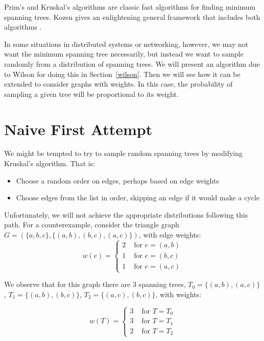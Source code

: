 \documentclass[11pt]{article}
\begin{document}
Prim's and Kruskal's algorithms are classic fast algorithms for finding minimum
spanning trees. Kozen gives an enlightening general framework that includes both
algorithms \cite{kozen}.

In some situations in distributed systems or networking, however, we may not
want the minimum spanning tree necessarily, but instead we want to sample
randomly from a distribution of spanning trees. We will present an algorithm due
to Wilson \cite{wilson} for doing this in Section~\ref{wilson}. Then we will see
how it can be extended to consider graphs with weights. In this case, the
probability of sampling a given tree will be proportional to its weight.



\section{Naive First Attempt}

We might be tempted to try to sample random spanning trees by modifying
Kruskal's algorithm. That is:
\begin{itemize}
\item Choose a random order on edges, perhaps based on edge weights
\item Choose edges from the list in order, skipping an edge if it would make a
cycle
\end{itemize}

Unfortunately, we will not achieve the appropriate distributions following this
path. For a counterexample, consider the triangle graph $G = (\{a,b,c\},
\{(a,b),(b,c),(a,c)\})$, with edge weights:
\[w(e) = \begin{cases}
        2 & \text{ for } e = (a,b)\\
        1 & \text{ for } e = (b,c)\\
        1 & \text{ for } e = (a,c)
        \end{cases}\]

We observe that for this graph there are 3 spanning trees,
$T_0 = \{(a,b), (a,c)\}$,
$T_1 = \{(a,b), (b,c)\}$,
$T_2 = \{(a,c), (b,c)\}$, with weights:

\[w(T) = \begin{cases}
        3 & \text{ for } T = T_0\\
        3 & \text{ for } T = T_1\\
        2 & \text{ for } T = T_2
        \end{cases}\]
\end{document}
